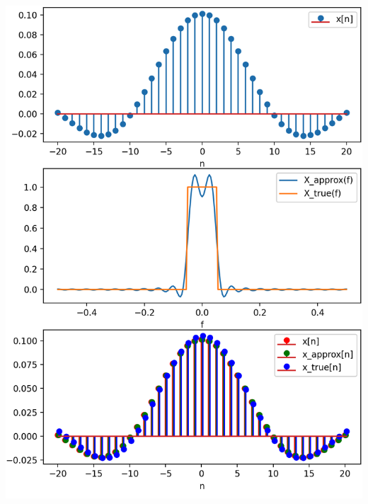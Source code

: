 \begin{listing}[h]
    \noindent
    \begin{minipage}{0.51\textwidth}
        \strut\vspace*{-\baselineskip}\newline
        \inputminted[firstline=5, lastline=48]{python3}{code/dtft.py}
    \end{minipage}%
    \begin{minipage}{0.48\textwidth}
        \strut\vspace*{-\baselineskip}\newline
        \includegraphics[width=\textwidth]{code/dtft.png}
    \end{minipage}
    \label{py:dtft}
\end{listing}
\FloatBarrier

